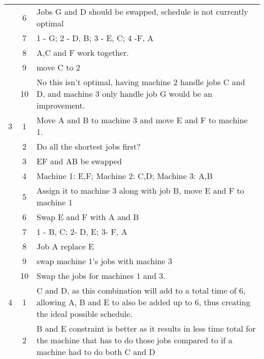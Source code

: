 \begin{tabularx}{\linewidth}{c c X}
	& 6 & Jobs G and D should be swapped, schedule is not currently optimal \\
	& 7 & 1 - G; 2 - D, B; 3 - E, C; 4 -F, A \\
	& 8 & A,C and F work together. \\
	& 9 & move C to 2 \\
	& 10 & No this isn't optimal, having machine 2 handle jobs C and D, and machine 3 only handle job G would be an improvement. \\
	\hline
	3 & 1 & Move A and B to machine 3 and move E and F to machine 1. \\
	& 2 & Do all the shortest jobs first? \\
	& 3 & EF and AB be swapped \\
	& 4 & Machine 1: E,F; Machine 2: C,D; Machine 3: A,B \\
	& 5 & Assign it to machine 3 along with job B, move E and F to machine 1 \\
	& 6 & Swap E and F with A and B \\
	& 7 & 1 - B, C; 2- D, E; 3- F, A \\
	& 8 & Job A replace E \\
	& 9 & swap machine 1's jobs with machine 3 \\
	& 10 & Swap the jobs for machines 1 and 3. \\
	\hline
	4 & 1 & C and D, as this combination will add to a total time of 6, allowing A, B and E to also be added up to 6, thus creating the ideal possible schedule. \\
	& 2 & B and E constraint is better as it results in less time total for the machine that has to do those jobs compared to if a machine had to do both C and D \\
	& 3 & B and E as it means that the time split will be 6/6 \\
	& 4 & Machine 1: A,B,E; Machine 2: C,D \\
	& 5 & Both at the same time work well. A B and E on machine 1 and C and D on machine 2. That results in a an optimum 6 time overall. \\
	& 6 & If jobs C and D are assigned together then the total time will be shorter than if B and E are assigned together. So C and D result in a better schedule \\
	& 7 & 1 - C, D; 2 - A, B, E \\
	& 8 & Put Job B with machine 2 is better. \\
	& 9 & theyre the same \\

\end{tabularx}
